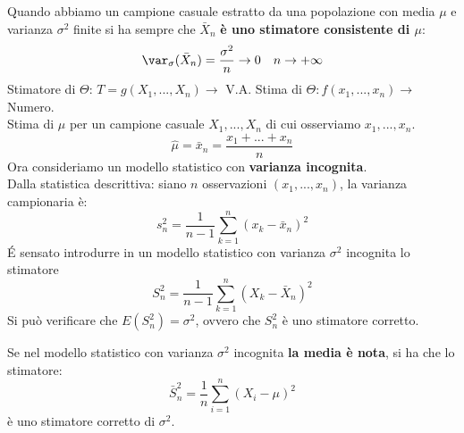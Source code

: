 Quando abbiamo un campione casuale estratto da una popolazione con media $\mu$
e varianza $\sigma^2$ finite si ha sempre che $\bar{X}_n$ \textbf{è uno stimatore consistente
di $\mu$}:
\[
    \var_\sigma(\bar{X}_n) = \frac{\sigma^2}{n} \rightarrow 0 \quad n \rightarrow + \infty
\]
Stimatore di $\Theta$: $T = g(X_1, ..., X_n) \rightarrow$ V.A.
Stima di $\Theta: f(x_1, ..., x_n) \rightarrow$ Numero.
\\ Stima di $\mu$ per un campione casuale $X_1, ..., X_n$ di cui osserviamo
$x_1, ..., x_n$.
\[
    \hat{\mu} = \bar{x}_n = \frac{x_1+...+x_n}{n}
\]
Ora consideriamo un modello statistico con \textbf{varianza incognita}.
\\ Dalla statistica descrittiva: siano $n$ osservazioni $(x_1, ..., x_n)$, la varianza campionaria è:
\[
    s^{2}_n=\frac{1}{n-1}\sum_{k=1}^n(x_k-\bar{x}_n)^2
\]
\'E sensato introdurre in un modello statistico con varianza $\sigma^2$ incognita lo
stimatore
\[
    S^{2}_n=\frac{1}{n-1}\sum_{k=1}^n(X_k-\bar{X}_n)^2
\]
Si può verificare che $E(S_n^2) = \sigma^2$, ovvero che $S_n^2$ è uno stimatore corretto.

Se nel modello statistico con varianza $\sigma^2$ incognita \textbf{la media è nota}, si ha che
lo stimatore:
\[
    \bar{S}^{2}_n = \frac{1}{n}\sum_{i=1}^n(X_i - \mu)^2
\]
è uno stimatore corretto di $\sigma^2$.


